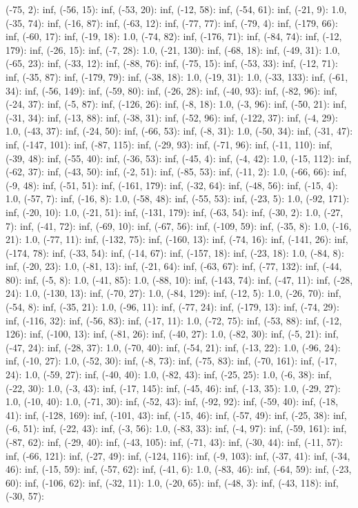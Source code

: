 \documentclass[parskip=half]{scrartcl}
\begin{document}
(-75, 2): inf, (-56, 15): inf, (-53, 20): inf, (-12, 58): inf, (-54, 61): inf, (-21, 9): 1.0, (-35, 74): inf, (-16, 87): inf, (-63, 12): inf, (-77, 77): inf, (-79, 4): inf, (-179, 66): inf, (-60, 17): inf, (-19, 18): 1.0, (-74, 82): inf, (-176, 71): inf, (-84, 74): inf, (-12, 179): inf, (-26, 15): inf, (-7, 28): 1.0, (-21, 130): inf, (-68, 18): inf, (-49, 31): 1.0, (-65, 23): inf, (-33, 12): inf, (-88, 76): inf, (-75, 15): inf, (-53, 33): inf, (-12, 71): inf, (-35, 87): inf, (-179, 79): inf, (-38, 18): 1.0, (-19, 31): 1.0, (-33, 133): inf, (-61, 34): inf, (-56, 149): inf, (-59, 80): inf, (-26, 28): inf, (-40, 93): inf, (-82, 96): inf, (-24, 37): inf, (-5, 87): inf, (-126, 26): inf, (-8, 18): 1.0, (-3, 96): inf, (-50, 21): inf, (-31, 34): inf, (-13, 88): inf, (-38, 31): inf, (-52, 96): inf, (-122, 37): inf, (-4, 29): 1.0, (-43, 37): inf, (-24, 50): inf, (-66, 53): inf, (-8, 31): 1.0, (-50, 34): inf, (-31, 47): inf, (-147, 101): inf, (-87, 115): inf, (-29, 93): inf, (-71, 96): inf, (-11, 110): inf, (-39, 48): inf, (-55, 40): inf, (-36, 53): inf, (-45, 4): inf, (-4, 42): 1.0, (-15, 112): inf, (-62, 37): inf, (-43, 50): inf, (-2, 51): inf, (-85, 53): inf, (-11, 2): 1.0, (-66, 66): inf, (-9, 48): inf, (-51, 51): inf, (-161, 179): inf, (-32, 64): inf, (-48, 56): inf, (-15, 4): 1.0, (-57, 7): inf, (-16, 8): 1.0, (-58, 48): inf, (-55, 53): inf, (-23, 5): 1.0, (-92, 171): inf, (-20, 10): 1.0, (-21, 51): inf, (-131, 179): inf, (-63, 54): inf, (-30, 2): 1.0, (-27, 7): inf, (-41, 72): inf, (-69, 10): inf, (-67, 56): inf, (-109, 59): inf, (-35, 8): 1.0, (-16, 21): 1.0, (-77, 11): inf, (-132, 75): inf, (-160, 13): inf, (-74, 16): inf, (-141, 26): inf, (-174, 78): inf, (-33, 54): inf, (-14, 67): inf, (-157, 18): inf, (-23, 18): 1.0, (-84, 8): inf, (-20, 23): 1.0, (-81, 13): inf, (-21, 64): inf, (-63, 67): inf, (-77, 132): inf, (-44, 80): inf, (-5, 8): 1.0, (-41, 85): 1.0, (-88, 10): inf, (-143, 74): inf, (-47, 11): inf, (-28, 24): 1.0, (-130, 13): inf, (-70, 27): 1.0, (-84, 129): inf, (-12, 5): 1.0, (-26, 70): inf, (-54, 8): inf, (-35, 21): 1.0, (-96, 11): inf, (-77, 24): inf, (-179, 13): inf, (-74, 29): inf, (-116, 32): inf, (-56, 83): inf, (-17, 11): 1.0, (-72, 75): inf, (-53, 88): inf, (-12, 126): inf, (-100, 13): inf, (-81, 26): inf, (-40, 27): 1.0, (-82, 30): inf, (-5, 21): inf, (-47, 24): inf, (-28, 37): 1.0, (-70, 40): inf, (-54, 21): inf, (-13, 22): 1.0, (-96, 24): inf, (-10, 27): 1.0, (-52, 30): inf, (-8, 73): inf, (-75, 83): inf, (-70, 161): inf, (-17, 24): 1.0, (-59, 27): inf, (-40, 40): 1.0, (-82, 43): inf, (-25, 25): 1.0, (-6, 38): inf, (-22, 30): 1.0, (-3, 43): inf, (-17, 145): inf, (-45, 46): inf, (-13, 35): 1.0, (-29, 27): 1.0, (-10, 40): 1.0, (-71, 30): inf, (-52, 43): inf, (-92, 92): inf, (-59, 40): inf, (-18, 41): inf, (-128, 169): inf, (-101, 43): inf, (-15, 46): inf, (-57, 49): inf, (-25, 38): inf, (-6, 51): inf, (-22, 43): inf, (-3, 56): 1.0, (-83, 33): inf, (-4, 97): inf, (-59, 161): inf, (-87, 62): inf, (-29, 40): inf, (-43, 105): inf, (-71, 43): inf, (-30, 44): inf, (-11, 57): inf, (-66, 121): inf, (-27, 49): inf, (-124, 116): inf, (-9, 103): inf, (-37, 41): inf, (-34, 46): inf, (-15, 59): inf, (-57, 62): inf, (-41, 6): 1.0, (-83, 46): inf, (-64, 59): inf, (-23, 60): inf, (-106, 62): inf, (-32, 11): 1.0, (-20, 65): inf, (-48, 3): inf, (-43, 118): inf, (-30, 57): 
\end{document}
